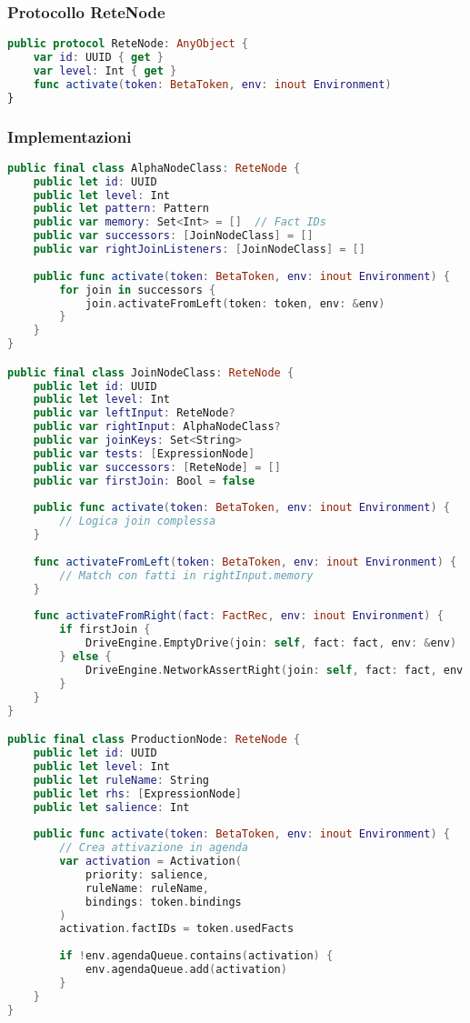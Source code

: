 \subsubsection{Protocollo ReteNode}

\begin{lstlisting}[language=Swift]
public protocol ReteNode: AnyObject {
    var id: UUID { get }
    var level: Int { get }
    func activate(token: BetaToken, env: inout Environment)
}
\end{lstlisting}

\subsubsection{Implementazioni}

\begin{lstlisting}[language=Swift]
public final class AlphaNodeClass: ReteNode {
    public let id: UUID
    public let level: Int
    public let pattern: Pattern
    public var memory: Set<Int> = []  // Fact IDs
    public var successors: [JoinNodeClass] = []
    public var rightJoinListeners: [JoinNodeClass] = []
    
    public func activate(token: BetaToken, env: inout Environment) {
        for join in successors {
            join.activateFromLeft(token: token, env: &env)
        }
    }
}

public final class JoinNodeClass: ReteNode {
    public let id: UUID
    public let level: Int
    public var leftInput: ReteNode?
    public var rightInput: AlphaNodeClass?
    public var joinKeys: Set<String>
    public var tests: [ExpressionNode]
    public var successors: [ReteNode] = []
    public var firstJoin: Bool = false
    
    public func activate(token: BetaToken, env: inout Environment) {
        // Logica join complessa
    }
    
    func activateFromLeft(token: BetaToken, env: inout Environment) {
        // Match con fatti in rightInput.memory
    }
    
    func activateFromRight(fact: FactRec, env: inout Environment) {
        if firstJoin {
            DriveEngine.EmptyDrive(join: self, fact: fact, env: &env)
        } else {
            DriveEngine.NetworkAssertRight(join: self, fact: fact, env: &env)
        }
    }
}

public final class ProductionNode: ReteNode {
    public let id: UUID
    public let level: Int
    public let ruleName: String
    public let rhs: [ExpressionNode]
    public let salience: Int
    
    public func activate(token: BetaToken, env: inout Environment) {
        // Crea attivazione in agenda
        var activation = Activation(
            priority: salience,
            ruleName: ruleName,
            bindings: token.bindings
        )
        activation.factIDs = token.usedFacts
        
        if !env.agendaQueue.contains(activation) {
            env.agendaQueue.add(activation)
        }
    }
}
\end{lstlisting}

